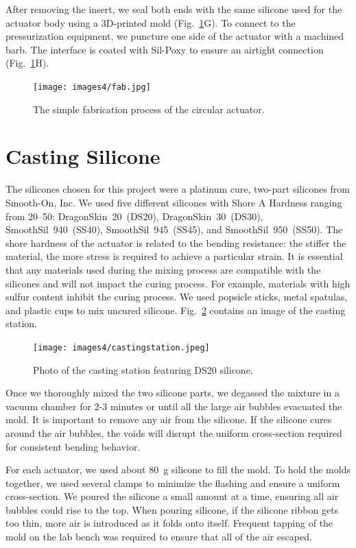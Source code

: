 After removing the insert, we seal both ends with the same silicone used for the actuator body using a 3D-printed mold (Fig.~\ref{figure:fab}G). To connect to the pressurization equipment, we puncture one side of the actuator with a machined barb. The interface is coated with Sil-Poxy to ensure an airtight connection (Fig.~\ref{figure:fab}H).

\begin{figure}[ht!]
    \centering
     \texttt{[image: images4/fab.jpg]}
    \caption{The simple fabrication process of the circular actuator.}
    \label{figure:fab}
\end{figure}

\clearpage
\section{Casting Silicone}

The silicones chosen for this project were a platinum cure, two-part silicones from Smooth-On, Inc. We used five different silicones with Shore A Hardness ranging from 20--50: DragonSkin~20~(DS20), DragonSkin~30~(DS30), SmoothSil~940~(SS40), SmoothSil~945~(SS45), and SmoothSil~950~(SS50). The shore hardness of the actuator is related to the bending resistance: the stiffer the material, the more stress is required to achieve a particular strain. It is essential that any materials used during the mixing process are compatible with the silicones and will not impact the curing process. For example, materials with high sulfur content inhibit the curing process. We used popsicle sticks, metal spatulas, and plastic cups to mix uncured silicone. Fig.~\ref{fig:castingstation} contains an image of the casting station. \\

\begin{figure}[ht]
    \centering
    \texttt{[image: images4/castingstation.jpeg]}
    \caption{Photo of the casting station featuring DS20 silicone.}
    \label{fig:castingstation}
\end{figure}

Once we thoroughly mixed the two silicone parts, we degassed the mixture in a vacuum chamber for 2-3 minutes or until all the large air bubbles evacuated the mold. It is important to remove any air from the silicone. If the silicone cures around the air bubbles, the voids will disrupt the uniform cross-section required for consistent bending behavior. 

For each actuator, we used about 80~g silicone to fill the mold. To hold the molds together, we used several clamps to minimize the flashing and ensure a uniform cross-section. We poured the silicone a small amount at a time, ensuring all air bubbles could rise to the top. When pouring silicone, if the silicone ribbon gets too thin, more air is introduced as it folds onto itself. Frequent tapping of the mold on the lab bench was required to ensure that all of the air escaped. 

